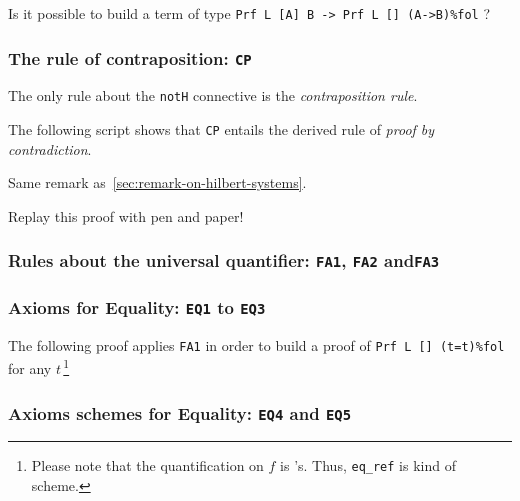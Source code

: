 \begin{exercise}[**]
  Is it possible to build a term of type
\texttt{Prf L [A] B -> Prf L [] (A->B)\%fol} ?
\end{exercise}

\subsubsection{The rule of contraposition: \texttt{CP}}

The only rule about the \texttt{notH} connective is
the \emph{contraposition rule}.



The following script shows that \texttt{CP} entails the 
derived rule of \emph{proof by contradiction}.

\label{prfex4}


\begin{remark}
Same remark as~\ref{sec:remark-on-hilbert-systems}.
\end{remark}

\begin{exercise}
  Replay this proof with pen and paper!
\end{exercise}


\subsubsection{Rules about the universal quantifier: \texttt{FA1},
\texttt{FA2} and\texttt{FA3}}






\subsubsection{Axioms for Equality: \texttt{EQ1} to \texttt{EQ3}}


The following proof applies \texttt{FA1} in order to build a proof
of \texttt{Prf L [] (t=t)\%fol}  for any $t$\,\footnote{Please note that the quantification on $f$ is \coq's. Thus, \texttt{eq\_ref} is kind of scheme.}



\subsubsection{Axioms schemes for Equality: \texttt{EQ4} and \texttt{EQ5}}

